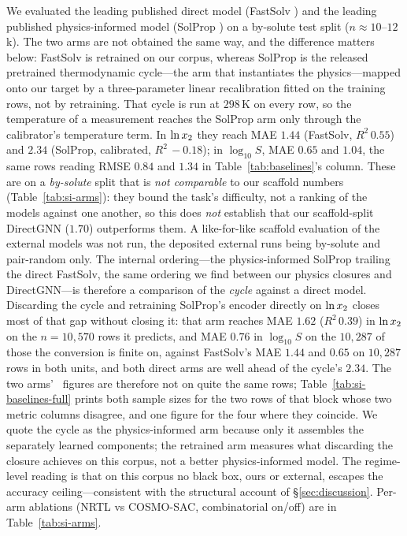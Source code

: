 We evaluated the leading published direct model (FastSolv \cite{osanloo2024}) and the
leading published physics-informed model (SolProp \cite{vermeire2022solprop}) on a
by-solute test split ($n\approx10$--$12$k). The two arms are not obtained
the same way, and the difference matters below: FastSolv is retrained on our corpus, whereas SolProp
is the released pretrained thermodynamic cycle---the arm that instantiates the physics---mapped onto
our target by a three-parameter linear recalibration fitted on the training rows, not by retraining.
That cycle is run at $298$\,K on every row, so the temperature of a measurement reaches the SolProp
arm only through the calibrator's temperature term. In $\ln x_2$ they
reach MAE $1.44$ (FastSolv, $R^2\,0.55$) and $2.34$ (SolProp, calibrated,
$R^2\,{-}0.18$); in $\log_{10}S$, MAE $0.65$ and $1.04$, the same rows reading RMSE $0.84$ and
$1.34$ in Table~\ref{tab:baselines}'s column. These are on a \emph{by-solute} split that is
\emph{not comparable} to our scaffold numbers (Table~\ref{tab:si-arms}): they bound the task's
difficulty, not a ranking of the models against one another, so this does \emph{not} establish that our
scaffold-split DirectGNN ($1.70$) outperforms them. A like-for-like scaffold evaluation of the
external models was not run, the deposited external runs being by-solute and pair-random only.
The internal ordering---the physics-informed SolProp trailing the direct FastSolv, the same
ordering we find between our physics closures and DirectGNN---is therefore a
comparison of the \emph{cycle} against a direct model. Discarding the cycle and retraining
SolProp's encoder directly on $\ln x_2$ closes most of that gap without closing it: that arm reaches
MAE $1.62$
($R^2\,0.39$) in $\ln x_2$ on the $n{=}10{,}570$ rows it predicts, and MAE $0.76$ in $\log_{10}S$ on the
$10{,}287$ of those the conversion is finite on, against FastSolv's MAE $1.44$ and $0.65$ on
$10{,}287$ rows in both units, and both direct arms are well ahead of the cycle's $2.34$.
The two arms' \lnx\ figures are therefore not on quite the same rows;
Table~\ref{tab:si-baselines-full} prints both sample sizes for the two rows of that block whose two
metric columns disagree, and one figure for the four where they coincide. We quote the cycle as the physics-informed arm because only it
assembles the separately learned components; the retrained arm measures what discarding the closure
achieves on this corpus, not a better physics-informed model. The regime-level reading is that on this corpus no
black box, ours or external, escapes the accuracy ceiling---consistent with the
structural account of \S\ref{sec:discussion}. Per-arm ablations (NRTL vs COSMO-SAC,
combinatorial on/off) are in Table~\ref{tab:si-arms}.

